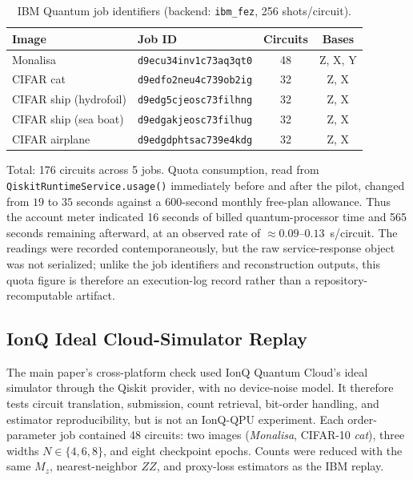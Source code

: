 \documentclass[11pt]{article}
\begin{document}
\begin{table}[H]
\centering
\caption{IBM Quantum job identifiers (backend: \texttt{ibm\_fez}, 256 shots/circuit).}
\scriptsize
\begin{tabular}{llcc}
\toprule
Image & Job ID & Circuits & Bases \\
\midrule
Monalisa & \texttt{d9ecu34inv1c73aq3qt0} & 48 & Z, X, Y \\
CIFAR cat & \texttt{d9edfo2neu4c739ob2ig} & 32 & Z, X \\
CIFAR ship (hydrofoil) & \texttt{d9edg5cjeosc73filhng} & 32 & Z, X \\
CIFAR ship (sea boat) & \texttt{d9edgakjeosc73filhug} & 32 & Z, X \\
CIFAR airplane & \texttt{d9edgdphtsac739e4kdg} & 32 & Z, X \\
\bottomrule
\end{tabular}
\end{table}

Total: 176 circuits across 5 jobs. Quota consumption, read from \texttt{QiskitRuntimeService.}\allowbreak\texttt{usage()} immediately before and after the pilot, changed from $19$ to $35$ seconds against a $600$-second monthly free-plan allowance. Thus the account meter indicated 16 seconds of billed quantum-processor time and 565 seconds remaining afterward, at an observed rate of $\approx\!0.09$--$0.13$~s/circuit. The readings were recorded contemporaneously, but the raw service-response object was not serialized; unlike the job identifiers and reconstruction outputs, this quota figure is therefore an execution-log record rather than a repository-recomputable artifact.

\subsection{IonQ Ideal Cloud-Simulator Replay}
The main paper's cross-platform check used IonQ Quantum Cloud's ideal simulator through the Qiskit provider, with no device-noise model. It therefore tests circuit translation, submission, count retrieval, bit-order handling, and estimator reproducibility, but is not an IonQ-QPU experiment. Each order-parameter job contained 48 circuits: two images (\textit{Monalisa}, CIFAR-10 \textit{cat}), three widths $N\in\{4,6,8\}$, and eight checkpoint epochs. Counts were reduced with the same $M_z$, nearest-neighbor $ZZ$, and proxy-loss estimators as the IBM replay.
\end{document}
